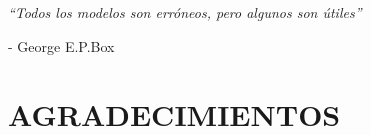 \documentclass[a4paper, 11pt, spanish, twoside]{article}
\newcommand\blankpage{%
    \null
    \thispagestyle{empty}%
    \newpage}
\begin{document}
 




\newpage
\thispagestyle{empty}







 
\newpage
\thispagestyle{empty}

\begin{flushright} %
\vspace*{5cm} %

\textit{“Todos los modelos son erróneos, pero algunos son útiles”} 

\medskip %
- George E.P.Box

\end{flushright}

\afterpage{\blankpage} %




\newpage
\thispagestyle{plain}

\section*{AGRADECIMIENTOS} %
\end{document}
